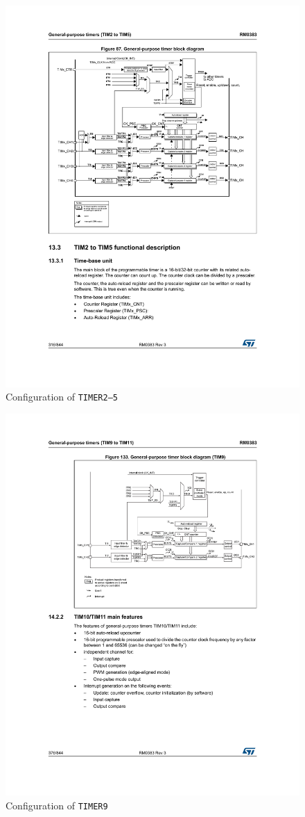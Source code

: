 \begin{figure}[htbp]
	\centering
	\includegraphics[width=.8\textwidth]{Figures/4_advanced_timer2-5_diagram.pdf}
	\caption{Configuration of \texttt{TIMER2--5}}
	\label{fig:4_timer2-5}
\end{figure}
\begin{figure}[htbp]
	\centering
	\includegraphics[width=.8\textwidth]{Figures/4_advanced_timer9_diagram.pdf}
	\caption{Configuration of \texttt{TIMER9}}
	\label{fig:4_timer9}
\end{figure}

